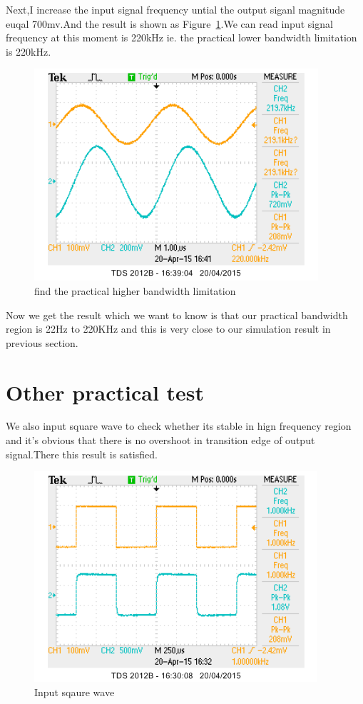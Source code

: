 Next,I increase the input signal frequency untial the output siganl magnitude euqal 700mv.And the result is shown as Figure~\ref{fig:find the practical higher bandwidth limitation}.We can read input signal frequency at this moment is 220kHz ie. the practical lower bandwidth limitation is 220kHz.

\begin{figure}[htbp]
\centering
\includegraphics[scale=1]{"../Photo/Chap7/higher band practical"}
\caption{find the practical higher bandwidth limitation}
\label{fig:find the practical higher bandwidth limitation}
\end{figure}

Now we get the result which we want to know is that our practical bandwidth region is 22Hz to 220KHz and this is very close to our simulation result in previous section.

\section{Other practical test}

We also input square wave to check whether its stable in hign frequency region and it's obvious that there is no overshoot in transition edge of output signal.There this result is satisfied.
\begin{figure}[htbp]
\centering
\includegraphics[scale=1]{"../Photo/Chap7/1ksquare"}
\caption{Input sqaure wave}
\label{fig:Input sqaure wave}
\end{figure}

